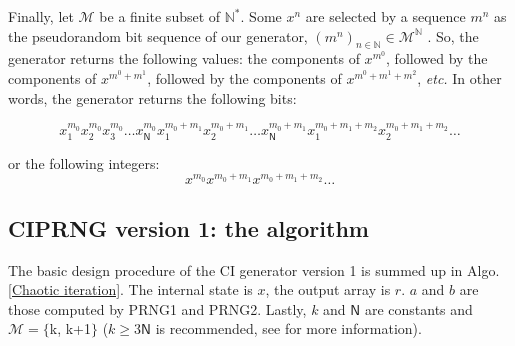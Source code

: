 Finally, let $\mathcal{M}$ be a finite subset of $\mathds{N}^*$. Some $x^n$ are selected by a sequence $m^n$ as the pseudorandom bit sequence of our generator, $(m^n)_{n \in \mathds{N}} \in \mathcal{M}^\mathds{N}$ . So, the generator returns the following values: the components of $x^{m^0}$, followed by the components of $x^{m^0+m^1}$, followed by the components of $x^{m^0+m^1+m^2}$, \emph{etc.} In other words, the generator returns the following bits:

$$x_1^{m_0}x_2^{m_0}x_3^{m_0}\hdots x_\mathsf{N}^{m_0}x_1^{m_0+m_1}x_2^{m_0+m_1}\hdots x_\mathsf{N}^{m_0+m_1} x_1^{m_0+m_1+m_2}x_2^{m_0+m_1+m_2}\hdots$$

\noindent or the following integers:$$x^{m_0}x^{m_0+m_1}x^{m_0+m_1+m_2}\hdots$$


\subsection{CIPRNG version 1: the algorithm}
The basic design procedure of the CI generator version 1 is summed up in Algo.\ref{Chaotic iteration}. The internal state is $x$, the output array is $r$. $a$ and $b$ are those computed by PRNG1 and PRNG2. Lastly, $k$ and $\mathsf{N}$ are constants and \linebreak $\mathcal{M}=\{$k, k+1$\}$ ($k\geqslant 3\mathsf{N}$ is recommended, see \cite{bibtexwangqianxue} for more information).


